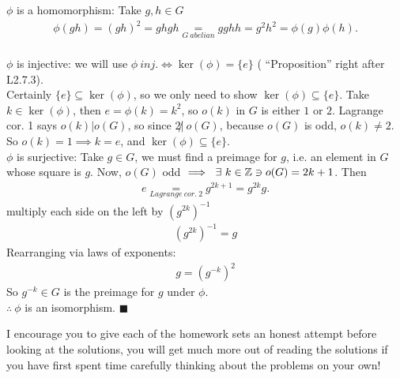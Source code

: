 \begin{enumerate}
    $\phi$ is a homomorphism: Take $g,h \in G$
    \begin{align*}
        \phi(gh) = (gh)^2 = ghgh \underset{G \ abelian}{=} gghh = g^2h^2 = \phi(g)\phi(h).
    \end{align*} \\
    $\phi$ is injective: we will use $\boxed{\phi \ inj. \iff \ker(\phi)=\{e\}}$ ( ``Proposition'' right after L2.7.3). \\
    Certainly $\{e\} \subseteq \ker(\phi)$, so we only need to show $\ker(\phi) \subseteq \{e\}$. Take $k\in \ker(\phi)$, then $e=\phi(k)=k^2$, so $o(k)$ in $G$ is either $1$ or $2$. Lagrange cor. 1 says $o(k)|o(G)$, so since $2 \not | \ o(G)$, because $o(G)$ is odd, $o(k)\neq 2$. So $o(k)=1 \implies k=e$, and $\ker(\phi) \subseteq \{e\}$. \steezybreak \\
    $\phi$ is surjective: Take $g\in G$, we must find a preimage for $g$, i.e. an element in $G$ whose square is $g$. Now, $o(G)$ odd $\implies \ \exists \ k\in {\mathbb{Z}} \ni o(G)=2k+1$. Then
    \begin{align*}
        e \underset{Lagrange \ cor. \ 2}{=} g^{2k+1} = g^{2k}g.
    \end{align*}
    multiply each side on the left by $(g^{2k})^{-1}$
    \begin{align*}
        (g^{2k})^{-1}= g
    \end{align*}
    Rearranging via laws of exponents:
    \begin{align*}
        g=(g^{-k})^2
    \end{align*}
    So $g^{-k}\in G$ is the preimage for $g$ under $\phi$. \\
    $\therefore \ \phi$ is an isomorphism. $\blacksquare$
\end{enumerate}
\newpage 



\begin{tcolorbox}
    I encourage you to give each of the homework sets an honest attempt before looking at the solutions, you will get much more out of reading the solutions if you have first spent time carefully thinking about the problems on your own!
\end{tcolorbox}
\vspace{-0.2in}
